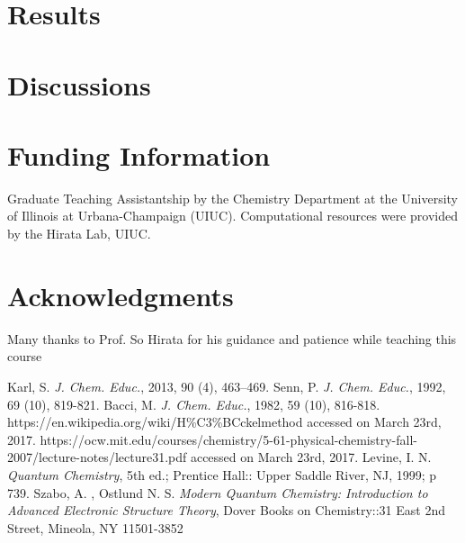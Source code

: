 \documentclass[9pt,twocolumn,twoside]{optica}
\begin{document}
\section{Results}


\section{Discussions}


\section*{Funding Information}
Graduate Teaching Assistantship by the Chemistry Department at the University of Illinois at Urbana-Champaign (UIUC). Computational resources were provided by the Hirata Lab, UIUC.
\section*{Acknowledgments}

Many thanks to Prof. So Hirata for his guidance and patience while teaching this course







\begin{thebibliography}{1}
Karl, S.  \textit{J. Chem. Educ.}, 2013, 90 (4), 463–469.
Senn, P. \textit{ J. Chem. Educ.}, 1992, 69 (10), 819-821.
Bacci, M.  \textit{J. Chem. Educ.}, 1982, 59 (10), 816-818.
https://en.wikipedia.org/wiki/H\%C3\%BCckelmethod accessed on March 23rd, 2017.
https://ocw.mit.edu/courses/chemistry/5-61-physical-chemistry-fall-2007/lecture-notes/lecture31.pdf accessed on March 23rd, 2017.
Levine, I. N. \textit{Quantum Chemistry}, 5th ed.; Prentice Hall:: Upper Saddle River, NJ, 1999; p 739.
  Szabo, A. , Ostlund N. S. \textit{  Modern Quantum Chemistry: Introduction to Advanced Electronic Structure Theory}, Dover Books on Chemistry::31 East 2nd Street, Mineola, NY 11501-3852


\end{thebibliography}
\end{document}
